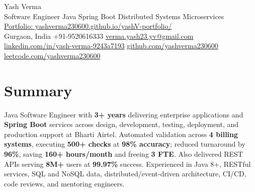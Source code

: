 \documentclass[letterpaper,11pt]{article}
\begin{document}
\begin{center}
  {\Huge Yash Verma} \\
  \small Software Engineer \textperiodcentered{} Java \textperiodcentered{} Spring Boot \textperiodcentered{} Distributed Systems \textperiodcentered{} Microservices \\
  \href{https://yashverma230600.github.io/yashV-portfolio/}{Portfolio: yashverma230600.github.io/yashV-portfolio/} \\
  \vspace{8pt}
  \small
  Gurgaon, India \textbar{}
  +91-9520616333 \textbar{}
  \href{mailto:verma.yash23.yv@gmail.com}{verma.yash23.yv@gmail.com} \textbar{}
  \href{https://www.linkedin.com/in/yash-verma-9243a7193/}{linkedin.com/in/yash-verma-9243a7193} \textbar{}
  \href{https://github.com/yashverma230600}{github.com/yashverma230600} \textbar{}
  \href{https://leetcode.com/yashverma230600}{leetcode.com/yashverma230600}
  \vspace{-8pt}
\end{center}

\section{Summary}
\begin{itemize}[leftmargin=0.15in, label={}]
  \small{\item{
    Java Software Engineer with \textbf{3+ years} delivering enterprise applications and \textbf{Spring Boot} services across design, development, testing, deployment, and production support at Bharti Airtel. Automated validation across \textbf{4 billing systems}, executing \textbf{500+ checks} at \textbf{98\% accuracy}; reduced turnaround by \textbf{96\%}, saving \textbf{160+ hours/month} and freeing \textbf{3 FTE}. Also delivered REST APIs serving \textbf{8M+} users at \textbf{99.97\%} success. Experienced in Java 8+, RESTful services, SQL and NoSQL data, distributed/event-driven architecture, CI/CD, code reviews, and mentoring engineers.
  }}
\end{itemize}
\vspace{-8pt}

\end{document}
